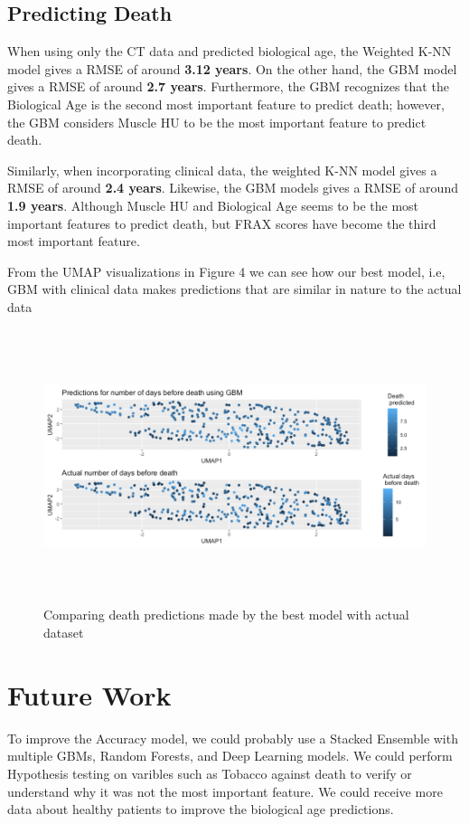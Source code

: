\documentclass{article}
\begin{document}
\subsection{Predicting Death}

When using only the CT data and predicted biological age, the Weighted K-NN model gives a RMSE of around \textbf{3.12 years}. On the other hand, the GBM model gives a RMSE of around \textbf{2.7 years}. Furthermore, the GBM recognizes that the Biological Age is the second most important feature to predict death; however, the GBM considers Muscle HU to be the most important feature to predict death. 

Similarly, when incorporating clinical data, the weighted K-NN model gives a RMSE of around \textbf{2.4 years}. Likewise, the GBM models gives a RMSE of around \textbf{1.9 years}. Although Muscle HU and Biological Age seems to be the most important features to predict death, but FRAX scores have become the third most important feature.

From the UMAP visualizations in Figure 4 we can see how our best model, i.e, GBM with clinical data makes predictions that are similar in nature to the actual data

\begin{figure}[h]
\includegraphics[height = 8cm]{fig1-11}
\caption{Comparing death predictions made by the best model with actual dataset}
\end{figure}



\section{Future Work}

To improve the Accuracy model, we could probably use a Stacked Ensemble with multiple GBMs, Random Forests, and Deep Learning models. We could perform Hypothesis testing on varibles such as Tobacco against death to verify or understand why it was not the most important feature. We could receive more data about healthy patients to improve the biological age predictions.
\end{document}
